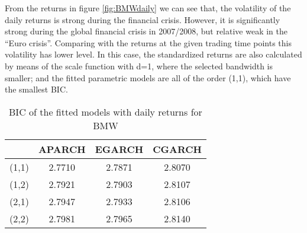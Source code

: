 From the returns in figure \ref{fig:BMWdaily} we can see that, the volatility of the daily returns is strong during the financial crisis. However, it is significantly strong during the global financial crisis in 2007/2008, but relative weak in the ``Euro crisis''. Comparing with the returns at the given trading time points this volatility has lower level. In this case, the standardized returns are also calculated by means of the scale function with d=1, where the selected bandwidth is smaller; and the fitted parametric models are all of the order (1,1), which have the smallest BIC.



\begin{table}[!h]
 \small
  \centering
  \vspace{2ex} 
\begin{tabular}{c|c|c|c}
\toprule
	 &	APARCH	& EGARCH	& CGARCH \\
\midrule
\hline		 
(1,1) &	2.7710	& 2.7871	& 2.8070 \\
(1,2) &	2.7921	& 2.7903	& 2.8107 \\
(2,1) &	2.7947	& 2.7933	& 2.8106 \\
(2,2) &	2.7981	& 2.7965	& 2.8140 \\
\bottomrule

\end{tabular}
  \caption{BIC of the fitted models with daily returns for BMW}
  \label{tab:dailyBICforBMW}
\end{table}




